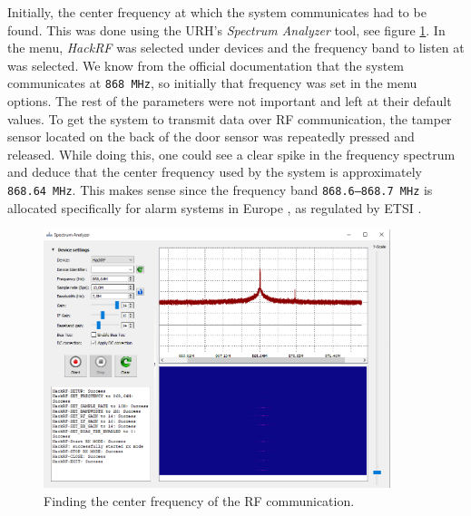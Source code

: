 Initially, the center frequency at which the system communicates had to be found. This was done using the URH's \textit{Spectrum Analyzer} tool, see figure \ref{fig:finding-center-freq}. In the menu, \textit{HackRF} was selected under devices and the frequency band to listen at was selected. We know from the official documentation that the system communicates at \texttt{868 MHz}, so initially that frequency was set in the menu options. The rest of the parameters were not important and left at their default values. To get the system to transmit data over RF communication, the tamper sensor located on the back of the door sensor was repeatedly pressed and released. While doing this, one could see a clear spike in the frequency spectrum and deduce that the center frequency used by the system is approximately \texttt{868.64 MHz}. This makes sense since the frequency band \texttt{868.6–868.7 MHz} is allocated specifically for alarm systems in Europe , as regulated by ETSI .
\begin{figure}[!ht]
    \centering
    \includegraphics[width=0.9\textwidth]{images/6-pentesting/find-frequency.png}
    \caption{Finding the center frequency of the RF communication.}
    \label{fig:finding-center-freq}
\end{figure}

